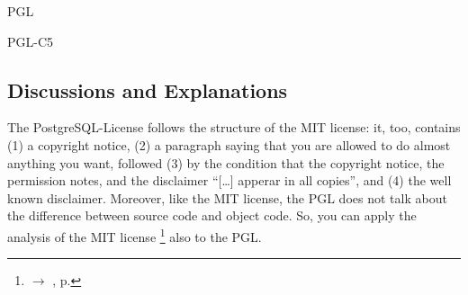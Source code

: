 \begin{license}{PGL}
\begin{lsuc}{PGL-C5}

  \begin{lsucrequires}
    \lsucmandatory{\giveLicense}
    \lsucoptional{\markModifications}
    \lsucoptional{\addToCopyrightDialog} 
    \lsucoptional{\linkToHomepage}
    \lsucoptional{\separateComponents}
  \end{lsucrequires}

  \lsucprohibitsnothing
\end{lsuc}


\subsection{Discussions and Explanations}

The PostgreSQL-License follows the structure of the MIT license: it, too, contains 
(1) a copyright notice, 
(2) a paragraph saying that you are allowed to do almost anything you want,
    followed 
(3) by the condition that the copyright notice, the permission notes, and the
    disclaimer \enquote{[\ldots] apperar in all copies}, and 
(4) the well known disclaimer.\citePGL{}
Moreover, like the MIT license, the PGL does not talk about the difference
between source code and object code. So, you can apply the analysis of the MIT
license%
  \footnote{$\rightarrow$ \oslic, p. \pageref{MITDiscussion}} 
also to the PGL.

\end{license}
%

